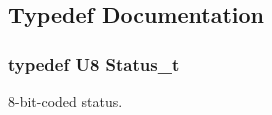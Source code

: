 \subsection{Typedef Documentation}
\hypertarget{group__group__xmega__utils_ga65a9dca1465decb9b96bb02fde36b2b8}{
\subsubsection[{Status\-\_\-t}]{\setlength{\rightskip}{0pt plus 5cm}typedef {\bf U8} {\bf Status\-\_\-t}}}\label{group__group__xmega__utils_ga65a9dca1465decb9b96bb02fde36b2b8}
8-\/bit-\/coded status. 